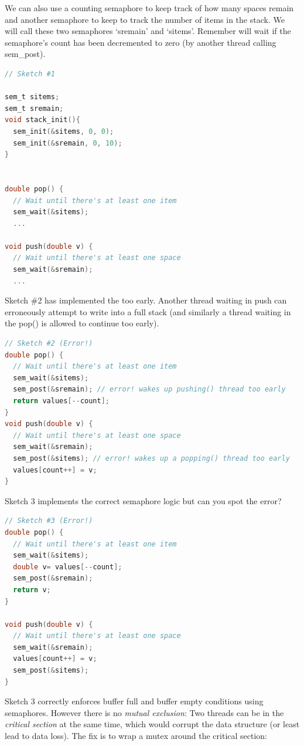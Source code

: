We can also use a counting semaphore to keep track of how many spaces remain and another semaphore to keep to track the number of items in the stack. We will call these two semaphores `sremain' and `sitems'. Remember  will wait if the semaphore's count has been decremented to zero (by another thread calling sem\_post).

\begin{lstlisting}[language=C]
// Sketch #1

sem_t sitems;
sem_t sremain;
void stack_init(){
  sem_init(&sitems, 0, 0);
  sem_init(&sremain, 0, 10);
}


double pop() {
  // Wait until there's at least one item
  sem_wait(&sitems);
  ...

void push(double v) {
  // Wait until there's at least one space
  sem_wait(&sremain);
  ...
\end{lstlisting}

Sketch \#2 has implemented the  too early. Another thread waiting in push can erroneously attempt to write into a full stack (and similarly a thread waiting in the pop() is allowed to continue too early).

\begin{lstlisting}[language=C]
// Sketch #2 (Error!)
double pop() {
  // Wait until there's at least one item
  sem_wait(&sitems);
  sem_post(&sremain); // error! wakes up pushing() thread too early
  return values[--count];
}
void push(double v) {
  // Wait until there's at least one space
  sem_wait(&sremain);
  sem_post(&sitems); // error! wakes up a popping() thread too early
  values[count++] = v;
}
\end{lstlisting}

Sketch 3 implements the correct semaphore logic but can you spot the error?

\begin{lstlisting}[language=C]
// Sketch #3 (Error!)
double pop() {
  // Wait until there's at least one item
  sem_wait(&sitems);
  double v= values[--count];
  sem_post(&sremain);
  return v;
}

void push(double v) {
  // Wait until there's at least one space
  sem_wait(&sremain);
  values[count++] = v;
  sem_post(&sitems); 
}
\end{lstlisting}

Sketch 3 correctly enforces buffer full and buffer empty conditions using semaphores. However there is no \emph{mutual exclusion}: Two threads can be in the \emph{critical section} at the same time, which would corrupt the data structure (or least lead to data loss). The fix is to wrap a mutex around the critical section:

